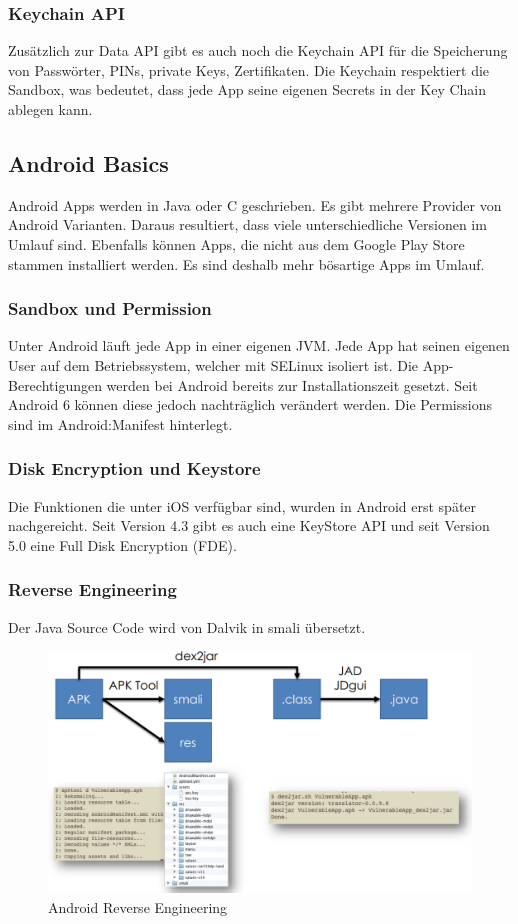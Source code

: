 \subsubsection{Keychain API}
Zusätzlich zur Data API gibt es auch noch die Keychain API für die Speicherung von Passwörter, PINs, private Keys, Zertifikaten. Die Keychain respektiert die Sandbox, was bedeutet, dass jede App seine eigenen Secrets in der Key Chain ablegen kann.


\subsection{Android Basics}
Android Apps werden in Java oder C geschrieben. Es gibt mehrere Provider von Android Varianten. Daraus resultiert, dass viele unterschiedliche Versionen im Umlauf sind. Ebenfalls können Apps, die nicht aus dem Google Play Store stammen installiert werden. Es sind deshalb mehr bösartige Apps im Umlauf.

\subsubsection{Sandbox und Permission}
Unter Android läuft jede App in einer eigenen JVM. Jede App hat seinen eigenen User auf dem Betriebssystem, welcher mit SELinux isoliert ist. Die App-Berechtigungen werden bei Android bereits zur Installationszeit gesetzt. Seit Android 6 können diese jedoch nachträglich verändert werden. Die Permissions sind im Android:Manifest hinterlegt.

\subsubsection{Disk Encryption und Keystore}
Die Funktionen die unter iOS verfügbar sind, wurden in Android erst später nachgereicht. Seit Version 4.3 gibt es auch eine KeyStore API und seit Version 5.0 eine Full Disk Encryption (FDE).

\subsubsection{Reverse Engineering}
Der Java Source Code wird von Dalvik in smali übersetzt. %
\begin{figure}[h!]
	\centering
	\includegraphics[width=0.7\linewidth]{images/android_reverseeng}
	\caption{Android Reverse Engineering}
	\label{fig:androidreverseeng}
\end{figure}


